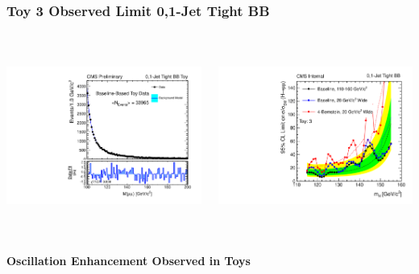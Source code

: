 \documentclass{beamer}
\begin{document}
\begin{frame}
\frametitle{Toy 3 Observed Limit 0,1-Jet Tight BB}
  \vspace{-1.5em}
  \begin{columns}[c]
    \column{60mm}
      \begin{center}
         \includegraphics[height=60mm]{wigglesStudy/toyFit4_Jets01PassPtG10BB_8TeV.pdf}
      \end{center}
    \column{60mm}
      \begin{center}
         \includegraphics[height=60mm]{wigglesStudy/compareLimits_TightBB_toy3.pdf}
      \end{center}
  \end{columns}
  \begin{center}
    \textbf{Oscillation Enhancement Observed in Toys}
  \end{center}
\end{frame}
\end{document}

